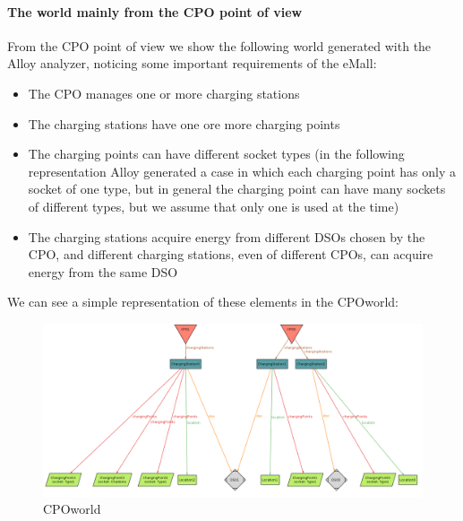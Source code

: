 \paragraph{The world mainly from the CPO point of view}
From the CPO point of view we show the following world generated with the Alloy analyzer, noticing some important requirements of the eMall:
\begin{itemize}
    \item The CPO manages one or more charging stations
    \item The charging stations have one ore more charging points
    \item The charging points can have different socket types (in the following representation Alloy generated a case in which each charging point has only a socket of one type, but in general the charging point can have many sockets of different types, but we assume that only one is used at the time)
    \item The charging stations acquire energy from different DSOs chosen by the CPO, and different charging stations, even of different CPOs, can acquire energy from the same DSO 
\end{itemize}
We can see a simple representation of these elements in the CPOworld:
\begin{figure}[H]
    \centering
    \includegraphics[width=1\textwidth]{Images/cp4/CPOWorld.png}
    \caption{CPOworld}
\end{figure}

